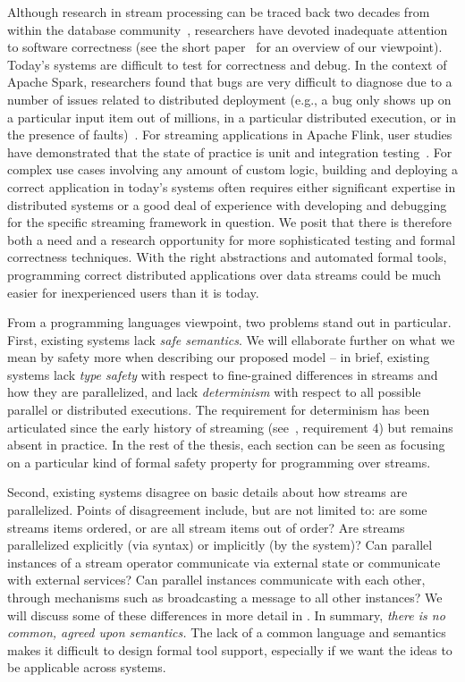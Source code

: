Although research in stream processing can be traced back two decades from within the database community~\cite{Aurora,Borealis,STREAM2004,Telegraph,ABW2006CQL},
researchers have devoted inadequate attention to software correctness (see the short paper~ for an overview of our viewpoint).
Today's systems are difficult to test for correctness and debug. In the context of Apache Spark, researchers found that bugs are very difficult to diagnose due to a number of issues related to distributed deployment (e.g., a bug only shows up on a particular input item out of millions, in a particular distributed execution, or in the presence of faults)~\cite{gulzar2016bigdebug}. For streaming applications in Apache Flink, user studies have demonstrated that the state of practice is unit and integration testing~\cite{vianna2019exploratory}.
For complex use cases involving any amount of custom logic, building and deploying a correct application in today's systems often requires either significant expertise in distributed systems or a good deal of experience with developing and debugging for the specific streaming framework in question. We posit that there is therefore both a need and a research opportunity for more sophisticated testing and formal correctness techniques. With the right abstractions and automated formal tools, programming correct distributed applications over data streams could be much easier for inexperienced users than it is today.

From a programming languages viewpoint, two problems stand out in particular. First, existing systems lack \emph{safe semantics}. We will ellaborate further on what we mean by safety more when describing our proposed model -- in brief, existing systems lack \emph{type safety} with respect to fine-grained differences in streams and how they are parallelized, and lack \emph{determinism} with respect to all possible parallel or distributed executions. The requirement for determinism has been articulated since the early history of streaming (see~\cite{stonebraker20058}, requirement 4) but remains absent in practice. In the rest of the thesis, each section can be seen as focusing on a particular kind of formal safety property for programming over streams.

Second, existing systems disagree on basic details about how streams are parallelized. Points of disagreement include, but are not limited to: are some streams items ordered, or are all stream items out of order? Are streams parallelized explicitly (via syntax) or implicitly (by the system)? Can parallel instances of a stream operator communicate via external state or communicate with external services? Can parallel instances communicate with each other, through mechanisms such as broadcasting a message to all other instances? We will discuss some of these differences in more detail in . In summary, \emph{there is no common, agreed upon semantics.} The lack of a common language and semantics makes it difficult to design formal tool support, especially if we want the ideas to be applicable across systems.

